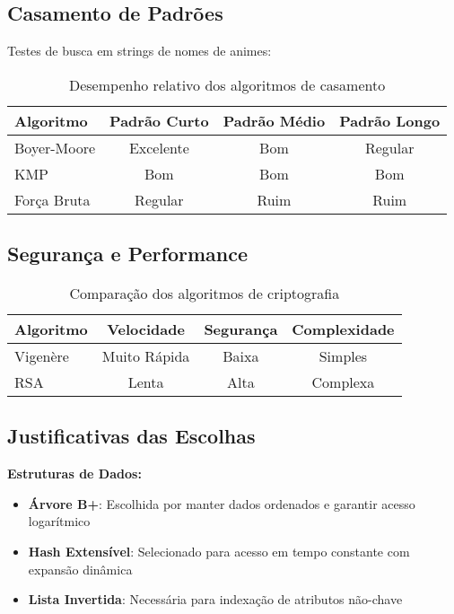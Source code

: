 \documentclass[12pt,a4paper]{article}
\let\oldsubsection\subsection
\renewcommand{\subsection}[1]{\needspace{3\baselineskip}\oldsubsection{#1}}
\begin{document}
\subsection{Casamento de Padrões}

Testes de busca em strings de nomes de animes:

\begin{table}[H]
\centering
\begin{tabular}{@{}lccc@{}}
\toprule
\textbf{Algoritmo} & \textbf{Padrão Curto} & \textbf{Padrão Médio} & \textbf{Padrão Longo} \\
\midrule
Boyer-Moore & Excelente & Bom & Regular \\
KMP & Bom & Bom & Bom \\
Força Bruta & Regular & Ruim & Ruim \\
\bottomrule
\end{tabular}
\caption{Desempenho relativo dos algoritmos de casamento}
\end{table}

\subsection{Segurança e Performance}

\begin{table}[H]
\centering
\begin{tabular}{@{}lccc@{}}
\toprule
\textbf{Algoritmo} & \textbf{Velocidade} & \textbf{Segurança} & \textbf{Complexidade} \\
\midrule
Vigenère & Muito Rápida & Baixa & Simples \\
RSA & Lenta & Alta & Complexa \\
\bottomrule
\end{tabular}
\caption{Comparação dos algoritmos de criptografia}
\end{table}

\subsection{Justificativas das Escolhas}

\textbf{Estruturas de Dados:}
\begin{itemize}
    \item \textbf{Árvore B+}: Escolhida por manter dados ordenados e garantir acesso logarítmico
    \item \textbf{Hash Extensível}: Selecionado para acesso em tempo constante com expansão dinâmica
    \item \textbf{Lista Invertida}: Necessária para indexação de atributos não-chave
\end{itemize}
\end{document}
